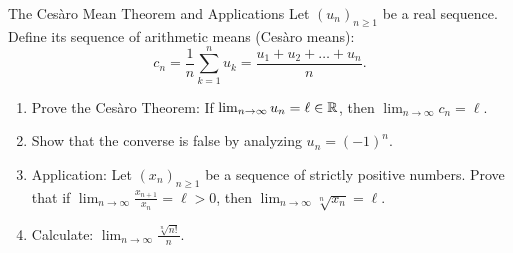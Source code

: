 \begin{exercise}{The Cesàro Mean Theorem and Applications}
Let $(u_n)_{n \ge 1}$ be a real sequence. Define its sequence of arithmetic means (Cesàro means):
\[
c_n = \frac{1}{n} \sum_{k=1}^n u_k = \frac{u_1 + u_2 + \dots + u_n}{n}.
\]
\begin{enumerate}[leftmargin=1.5em,itemsep=2pt]
  \item Prove the Cesàro Theorem: If $\lim_{n \to \infty} u_n = \ell \in \mathbb{R}$, then $\lim_{n \to \infty} c_n = \ell$.
  \item Show that the converse is false by analyzing $u_n = (-1)^n$.
  \item Application: Let $(x_n)_{n \ge 1}$ be a sequence of strictly positive numbers. Prove that if $\lim_{n \to \infty} \frac{x_{n+1}}{x_n} = \ell > 0$, then $\lim_{n \to \infty} \sqrt[n]{x_n} = \ell$.
  \item Calculate: $\lim_{n \to \infty} \frac{\sqrt[n]{n!}}{n}$.
\end{enumerate}
\end{exercise}

\begin{tabletworkspace}[5.5cm]
\end{tabletworkspace}

